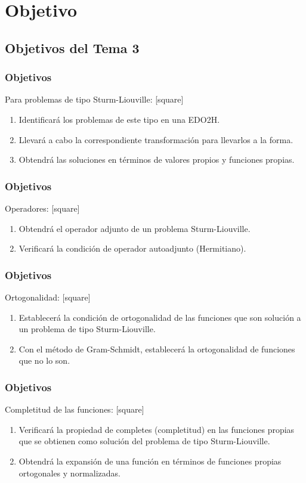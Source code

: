 \documentclass[12pt]{beamer}
\numberwithin{equation}{section}
\begin{document}
\section{Objetivo}
\subsection{Objetivos del Tema 3}

\begin{frame}
\frametitle{Objetivos}
Para problemas de tipo Sturm-Liouville:
[square]
\begin{enumerate}[<+->]
\item Identificará los problemas de este tipo en una EDO2H.
\item Llevará a cabo la correspondiente transformación para llevarlos a la forma.
\item Obtendrá las soluciones en términos de valores propios y funciones propias.
\seti
\end{enumerate}
\end{frame}
\begin{frame}
\frametitle{Objetivos}
Operadores:
[square]
\begin{enumerate}[<+->]
\conti
\item Obtendrá el operador adjunto de un problema Sturm-Liouville.
\item Verificará la condición de operador autoadjunto (Hermitiano).
\seti
\end{enumerate}
\end{frame}
\begin{frame}
\frametitle{Objetivos}
Ortogonalidad:
[square]
\begin{enumerate}[<+->]
\conti
\item Establecerá la condición de ortogonalidad de las funciones que son solución a un problema de tipo Sturm-Liouville.
\item Con el método de Gram-Schmidt, establecerá la ortogonalidad de funciones que no lo son.
\seti
\end{enumerate}
\end{frame}
\begin{frame}
\frametitle{Objetivos}
Completitud de las funciones:
[square]
\begin{enumerate}[<+->]
\conti
\item Verificará la propiedad de completes (completitud) en las funciones propias que se obtienen como solución del problema de tipo Sturm-Liouville.
\item Obtendrá la expansión de una función en términos de funciones propias ortogonales y normalizadas.
\end{enumerate}
\end{frame}
\end{document}
